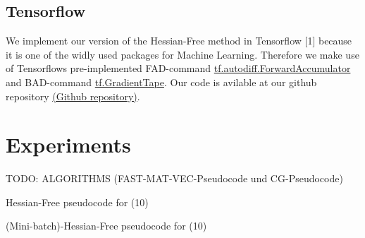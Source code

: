 \documentclass[conference]{IEEEtran}
\begin{document}
\subsection{Tensorflow}
We implement our version of the Hessian-Free method in Tensorflow [1] because it is one of the widly used packages for Machine Learning.
Therefore we make use of Tensorflows pre-implemented FAD-command \href{https://www.tensorflow.org/api_docs/python/tf/autodiff/ForwardAccumulator}{tf.autodiff.ForwardAccumulator} and BAD-command \href{https://www.tensorflow.org/api_docs/python/tf/GradientTape}{tf.GradientTape}. Our code is avilable at our github repository \href{https://github.com/NiklasBrunn/Hessian_Free_Optimization_of_Deep_Neural_Networks}{(Github repository)}.



\section{Experiments}
TODO: ALGORITHMS (FAST-MAT-VEC-Pseudocode und CG-Pseudocode)

\begin{algorithm}
	\caption{Hessian-Free pseudocode for (10)}\label{alg:one}
\end{algorithm}

\begin{algorithm}
	\caption{(Mini-batch)-Hessian-Free pseudocode for (10)}\label{alg:two}
\end{algorithm}
\end{document}
